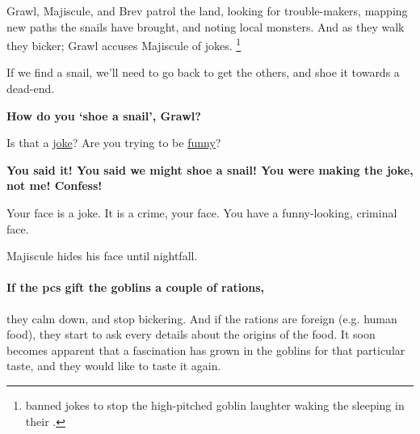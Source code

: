 Grawl, Majiscule, and Brev patrol the land, looking for trouble-makers, mapping new paths the snails have brought, and noting local monsters.
And as they walk they bicker; Grawl accuses Majiscule of jokes.%
\footnote{ banned jokes to stop the high-pitched goblin laughter waking the  sleeping in their .}

\begin{speechtext}
  If we find a snail, we'll need to go back to get the others, and shoe it towards a dead-end.

  \textbf{How do you `shoe a snail', Grawl?}

  Is that a \underline{joke}?
  Are you trying to be \underline{funny}?

  \textbf{You said it!
  You said we might shoe a snail!
  You were making the joke, not me!
  Confess!}

  Your face is a joke.
  It is a crime, your face.
  You have a funny-looking, criminal face.
\end{speechtext}

Majiscule hides his face until nightfall.




\paragraph{If the \glspl{pc} gift the goblins a couple of \glspl{ration},}
they calm down, and stop bickering.
And if the \glspl{ration} are foreign (e.g. human food), they start to ask every details about the origins of the food.
It soon becomes apparent that a fascination has grown in the goblins for that particular taste, and they would like to taste it again.

